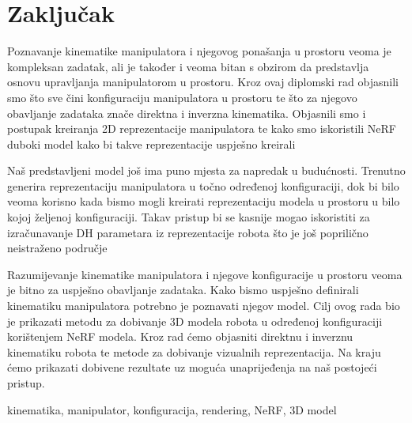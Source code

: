 \documentclass[times, utf8, diplomskirad]{fer}
\begin{document}
\chapter{Zaključak}
\label{pog:zakljucak}
Poznavanje kinematike manipulatora i njegovog ponašanja u prostoru veoma je kompleksan zadatak, ali je također i veoma bitan s obzirom da predstavlja osnovu upravljanja manipulatorom u prostoru.
Kroz ovaj diplomski rad objasnili smo što sve čini konfiguraciju manipulatora u prostoru te što za njegovo obavljanje zadataka znače direktna i inverzna kinematika.
Objasnili smo i postupak kreiranja 2D reprezentacije manipulatora te kako smo iskoristili NeRF duboki model kako bi takve reprezentacije uspješno kreirali

Naš predstavljeni model još ima puno mjesta za napredak u budućnosti.
Trenutno generira reprezentaciju manipulatora u točno određenoj konfiguraciji, dok bi bilo veoma korisno kada bismo mogli kreirati reprezentaciju modela u prostoru u bilo kojoj željenoj konfiguraciji.
Takav pristup bi se kasnije mogao iskoristiti za izračunavanje DH parametara iz reprezentacije robota što je još poprilično neistraženo područje






\begin{sazetak}
    Razumijevanje kinematike manipulatora i njegove konfiguracije u prostoru veoma je bitno za uspješno obavljanje zadataka.
    Kako bismo uspješno definirali kinematiku manipulatora potrebno je poznavati njegov model.
    Cilj ovog rada bio je prikazati metodu za dobivanje 3D modela robota u određenoj konfiguraciji korištenjem NeRF modela.
    Kroz rad ćemo objasniti direktnu i inverznu kinematiku robota te metode za dobivanje vizualnih reprezentacija.
    Na kraju ćemo prikazati dobivene rezultate uz moguća unaprijeđenja na naš postojeći pristup.
\end{sazetak}

\begin{kljucnerijeci}
    kinematika, manipulator, konfiguracija, rendering, NeRF, 3D model
\end{kljucnerijeci}
\end{document}
